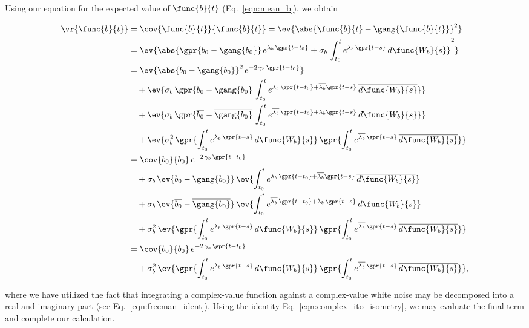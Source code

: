 Using our equation for the expected value of $\func{b}{t}$ (Eq.~\ref{eqn:mean_b}), we obtain

\begin{align}
    \vr{\func{b}{t}} &= \cov{\func{b}{t}}{\func{b}{t}} = \ev{\abs{\func{b}{t} - \gang{\func{b}{t}}}^2} \nonumber \\
    	&= \ev{\abs{\gpr{b_0 - \gang{b_0}}\,e^{\lambda_{b}\,\gpr{t - t_0}} + \sigma_b\,\int_{t_0}^{t} e^{\lambda_{b}\,\gpr{t - s}}\,d\func{W_{b}}{s}}^2} \nonumber \\
    	&= \ev{\abs{b_0 - \gang{b_0}}^2\,e^{-2\,\gamma_{b}\,\gpr{t - t_0}}} \nonumber \\
    		&\quad + \ev{\sigma_b\,\gpr{b_0 - \gang{b_0}\,\int_{t_0}^{t} e^{\lambda_b\,\gpr{t - t_0} + \overline{\lambda_b}\gpr{t - s}}\,\overline{d\func{W_b}{s}}}} \nonumber \\
    		&\quad + \ev{\sigma_b\,\gpr{\overline{b_0} - \overline{\gang{b_0}}\,\int_{t_0}^{t} e^{\overline{\lambda_b}\,\gpr{t - t_0} + \lambda_b\gpr{t - s}}\,d\func{W_b}{s}}} \nonumber \\
    		&\quad + \ev{\sigma_b^2\,\gpr{\int_{t_0}^{t} e^{\lambda_b\,\gpr{t - s}}\,d\func{W_b}{s}}\,\gpr{\int_{t_0}^{t} e^{\overline{\lambda_b}\,\gpr{t - s}}\,\overline{d\func{W_b}{s}}}} \nonumber \\
    	&= \cov{b_0}{b_0}\,e^{-2\,\gamma_{b}\,\gpr{t - t_0}} \nonumber \\
    		&\quad + \sigma_b\,\ev{b_0 - \gang{b_0}}\,\ev{\int_{t_0}^{t} e^{\lambda_b\,\gpr{t - t_0} + \overline{\lambda_b}\gpr{t - s}}\,\overline{d\func{W_b}{s}}} \nonumber \\
    		&\quad + \sigma_b\,\ev{\overline{b_0} - \overline{\gang{b_0}}}\,\ev{\int_{t_0}^{t} e^{\overline{\lambda_b}\,\gpr{t - t_0} + \lambda_b\,\gpr{t - s}}\,d\func{W_b}{s}} \nonumber \\
    		&\quad + \sigma_b^{2}\,\ev{\gpr{\int_{t_0}^{t} e^{\lambda_b\,\gpr{t - s}}\,d\func{W_b}{s}}\,\gpr{\int_{t_0}^{t} e^{\overline{\lambda_b}\,\gpr{t - s}}\,\overline{d\func{W_b}{s}}}} \nonumber \\
    	&= \cov{b_0}{b_0}\,e^{-2\,\gamma_{b}\,\gpr{t - t_0}} \nonumber \\
    		&\quad + \sigma_b^{2}\,\ev{\gpr{\int_{t_0}^{t} e^{\lambda_b\,\gpr{t - s}}\,d\func{W_b}{s}}\,\gpr{\int_{t_0}^{t} e^{\overline{\lambda_b}\,\gpr{t - s}}\,\overline{d\func{W_b}{s}}}},
\end{align}

where we have utilized the fact that integrating a complex-value function against a complex-value white noise may be decomposed into a real and imaginary part (see Eq.~\ref{eqn:freeman_ident}). Using the identity Eq.~\ref{eqn:complex_ito_isometry}, we may evaluate the final term and complete our calculation.


